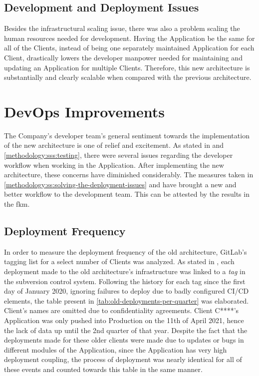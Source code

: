 \subsection{Development and Deployment Issues}\label{results-and-discussion:ss:development-and-deployment-issues}

Besides the infrastructural scaling issue, there was also a problem scaling the human resources needed for development. Having the Application be the same for all of the Clients, instead of being one separately maintained Application for each Client, drastically lowers the developer manpower needed for maintaining and updating an Application for multiple Clients. Therefore, this new architecture is substantially and clearly scalable when compared with the previous architecture.

\section{DevOps Improvements}\label{results-and-discussion:s:devops-improvements}

The Company's developer team's general sentiment towards the implementation of the new architecture is one of relief and excitement. As stated in  and \cref{methodology:sss:testing}, there were several issues regarding the developer workflow when working in the Application. After implementing the new architecture, these concerns have diminished considerably. The measures taken in \cref{methodology:ss:solving-the-deployment-issues} and  have brought a new and better workflow to the development team. This can be attested by the results in the \gls{fkm}.

\subsection{Deployment Frequency}\label{results-and-discussion:ss:deployment}

In order to measure the deployment frequency of the old architecture, GitLab's tagging list for a select number of Clients was analyzed. As stated in , each deployment made to the old architecture's infrastructure was linked to a \textit{tag} in the subversion control system. Following the history for each tag since the first day of January 2020, ignoring failures to deploy due to badly configured CI/CD elements, the table present in \cref{tab:old-deployments-per-quarter} was elaborated. Client's names are omitted due to confidentiality agreements. Client C****'s Application was only pushed into Production on the 11th of April 2021, hence the lack of data up until the 2nd quarter of that year. Despite the fact that the deployments made for these older clients were made due to updates or bugs in different modules of the Application, since the Application has very high deployment coupling, the process of deployment was nearly identical for all of these events and counted towards this table in the same manner.


